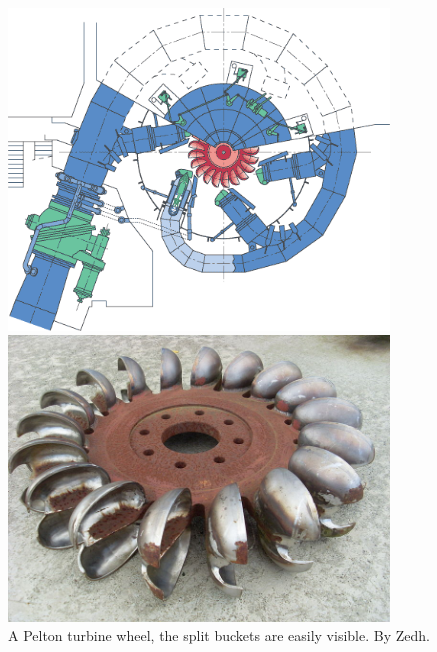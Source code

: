         
        \begin{figure}
            \begin{minipage}[b]{0.49\linewidth}
                \centering
                \includegraphics[width = 0.9\textwidth]{report/figures/introduction/pelton.png}
                \caption{Cross section of a Pelton turbine with $6$ needles. By Voith Siemens Hydro Power Generation.\footnote{Licensed under GFDL, Wikimedia Commons \url{https://commons.wikimedia.org/wiki/File:S_vs_pelton_schnitt_1_zoom.png}}} 
                \label{fig:pelton_turbine}
            \end{minipage}
            \hfill\vline\hfill
            \begin{minipage}[b]{0.49\linewidth}
                \centering
                \includegraphics[width = 0.9\textwidth]{report/figures/introduction/pelton_bucket.jpg}
                \caption{A Pelton turbine wheel, the split buckets are easily visible. By Zedh. } 
                \label{fig:pelton_bucket}
            \end{minipage}
        \end{figure}
        
